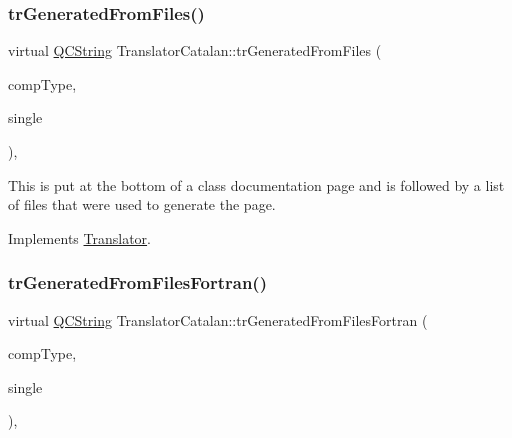 \mbox{\label{class_translator_catalan_a7ab864951a8636d1cb164295efec5758}} 
\subsubsection{\texorpdfstring{trGeneratedFromFiles()}{trGeneratedFromFiles()}}
{\footnotesize\ttfamily virtual \mbox{\hyperlink{class_q_c_string}{Q\+C\+String}} Translator\+Catalan\+::tr\+Generated\+From\+Files (\begin{DoxyParamCaption}\item[{\mbox{\hyperlink{class_class_def_ae70cf86d35fe954a94c566fbcfc87939}{Class\+Def\+::\+Compound\+Type}}}]{comp\+Type,  }\item[{bool}]{single }\end{DoxyParamCaption})\hspace{0.3cm}{\ttfamily [inline]}, {\ttfamily [virtual]}}

This is put at the bottom of a class documentation page and is followed by a list of files that were used to generate the page. 

Implements \mbox{\hyperlink{class_translator}{Translator}}.

\mbox{\label{class_translator_catalan_a02f372d3c14b138b96a6db845cd1d3d0}} 
\subsubsection{\texorpdfstring{trGeneratedFromFilesFortran()}{trGeneratedFromFilesFortran()}}
{\footnotesize\ttfamily virtual \mbox{\hyperlink{class_q_c_string}{Q\+C\+String}} Translator\+Catalan\+::tr\+Generated\+From\+Files\+Fortran (\begin{DoxyParamCaption}\item[{\mbox{\hyperlink{class_class_def_ae70cf86d35fe954a94c566fbcfc87939}{Class\+Def\+::\+Compound\+Type}}}]{comp\+Type,  }\item[{bool}]{single }\end{DoxyParamCaption})\hspace{0.3cm}{\ttfamily [inline]}, {\ttfamily [virtual]}}

